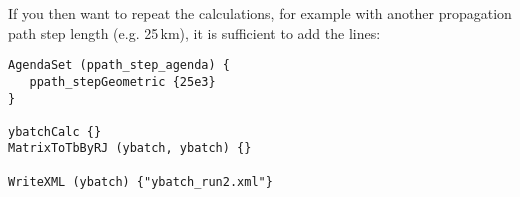 If you then want to repeat the calculations, for example with another
propagation path step length (e.g. 25\,km), it is sufficient to add
the lines:

\begin{verbatim}
AgendaSet (ppath_step_agenda) {
   ppath_stepGeometric {25e3}
}

ybatchCalc {}
MatrixToTbByRJ (ybatch, ybatch) {}

WriteXML (ybatch) {"ybatch_run2.xml"}
\end{verbatim}


